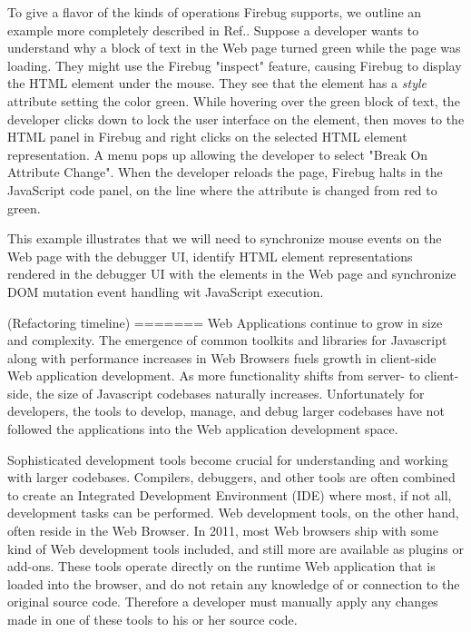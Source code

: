 To give a flavor of the kinds of operations Firebug supports, we outline  an example more completely
described in Ref.\cite{jjb-www2010}. Suppose a developer wants to understand why a block of text 
in the Web page turned green while the page was loading. They might use the Firebug "inspect" feature, 
causing Firebug to display the HTML element under the mouse. They see that the element has a \textit{style}
attribute setting the color green. While hovering over the green block of text, 
the developer clicks down to lock
the user interface on the element, then moves to the HTML panel in Firebug and right clicks on the 
selected HTML element representation. A menu pops up allowing the developer to select "Break On Attribute Change". 
When the developer reloads the page, Firebug halts in the JavaScript code panel, on the line where 
the attribute is changed from red to green.

This example illustrates that we will need to synchronize mouse events on the Web page with the debugger UI,
identify HTML element representations rendered in the debugger UI with the elements in the Web page and synchronize
DOM mutation event handling wit JavaScript execution.


(Refactoring timeline)
=======
Web Applications continue to grow in size and complexity. The
emergence of common toolkits and libraries for Javascript along with performance
increases in Web Browsers fuels growth in client-side Web application
development. As more functionality shifts from server- to client-side, the size
of Javascript codebases naturally increases. Unfortunately for developers, the
tools to develop, manage, and debug larger codebases have not followed the
applications into the Web application development space.

Sophisticated development tools become crucial for understanding
and working with larger codebases. Compilers, debuggers, and other tools are
often combined to create an Integrated Development Environment (IDE) where
most, if not all, development tasks can be performed. Web development tools, on
the other hand, often reside in the Web Browser. In 2011, most Web
browsers ship with some kind of Web development tools included\cite{something},
and still more are available as plugins or add-ons. These tools operate
directly on the runtime Web application that is loaded into the browser, and do
not retain any knowledge of or connection to the original source code. Therefore
a developer must manually apply any changes made in one of these tools to his or
her source code.

